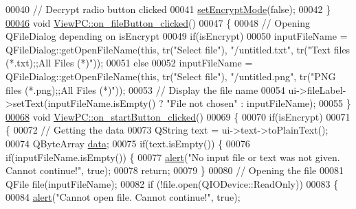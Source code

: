\begin{DoxyCode}
00040     \textcolor{comment}{// Decrypt radio button clicked}
00041     \mbox{\hyperlink{class_view_p_c_a5b48951efefdc0e3039c9a4bf185320b}{setEncryptMode}}(\textcolor{keyword}{false});
00042 \}
\mbox{\hyperlink{class_view_p_c_a3b9b7a7be9702d8b160f257f1c74a776}{00046}} \textcolor{keywordtype}{void} \mbox{\hyperlink{class_view_p_c_a3b9b7a7be9702d8b160f257f1c74a776}{ViewPC::on\_fileButton\_clicked}}()
00047 \{
00048     \textcolor{comment}{// Opening QFileDialog depending on isEncrypt}
00049     \textcolor{keywordflow}{if}(isEncrypt)
00050         inputFileName = QFileDialog::getOpenFileName(\textcolor{keyword}{this}, tr(\textcolor{stringliteral}{"Select file"}), \textcolor{stringliteral}{"/untitled.txt"}, tr(\textcolor{stringliteral}{"Text
       files (*.txt);;All Files (*)"}));
00051     \textcolor{keywordflow}{else}
00052         inputFileName = QFileDialog::getOpenFileName(\textcolor{keyword}{this}, tr(\textcolor{stringliteral}{"Select file"}), \textcolor{stringliteral}{"/untitled.png"}, tr(\textcolor{stringliteral}{"PNG
       files (*.png);;All Files (*)"}));
00053     \textcolor{comment}{// Display the file name}
00054     ui->fileLabel->setText(inputFileName.isEmpty() ? \textcolor{stringliteral}{"File not chosen"} : inputFileName);
00055 \}
\mbox{\hyperlink{class_view_p_c_a456d75b7c5d3a089302a576e7359f1f4}{00068}} \textcolor{keywordtype}{void} \mbox{\hyperlink{class_view_p_c_a456d75b7c5d3a089302a576e7359f1f4}{ViewPC::on\_startButton\_clicked}}()
00069 \{
00070     \textcolor{keywordflow}{if}(isEncrypt)
00071     \{
00072         \textcolor{comment}{// Getting the data}
00073         QString text = ui->text->toPlainText();
00074         QByteArray \mbox{\hyperlink{namespace_errors_dict_setup_af570460846fb9f0c91abd308a095dcdc}{data}};
00075         \textcolor{keywordflow}{if}(text.isEmpty()) \{
00076             \textcolor{keywordflow}{if}(inputFileName.isEmpty()) \{
00077                 \mbox{\hyperlink{class_view_p_c_a7c467169467789561078abc9d4fe57bd}{alert}}(\textcolor{stringliteral}{"No input file or text was not given. Cannot continue!"}, \textcolor{keyword}{true});
00078                 \textcolor{keywordflow}{return};
00079             \}
00080             \textcolor{comment}{// Opening the file}
00081             QFile file(inputFileName);
00082             \textcolor{keywordflow}{if} (!file.open(QIODevice::ReadOnly))
00083             \{
00084                 \mbox{\hyperlink{class_view_p_c_a7c467169467789561078abc9d4fe57bd}{alert}}(\textcolor{stringliteral}{"Cannot open file. Cannot continue!"}, \textcolor{keyword}{true});

\end{DoxyCode}
